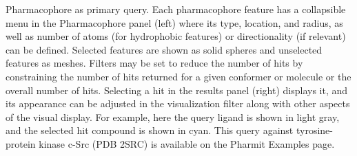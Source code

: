 \label{pharmfig} 
Pharmacophore as primary query. Each pharmacophore feature has a collapsible menu in the Pharmacophore panel (left) where its type, location, and radius, as well as number of atoms (for hydrophobic features) or directionality (if relevant) can be defined. Selected features are shown as solid spheres and unselected features as meshes. Filters may be set to reduce the number of hits by constraining the number of hits returned for a given conformer or molecule or the overall number of hits. Selecting a hit in the results panel (right) displays it, and its appearance can be adjusted in the visualization filter along with other aspects of the visual display.  For example, here the query ligand is shown in light gray, and the selected hit compound is shown in cyan. This query against tyrosine-protein kinase c-Src (PDB 2SRC) is available on the Pharmit Examples page.

